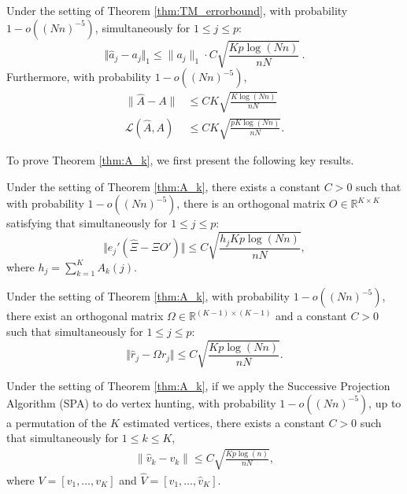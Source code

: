 \documentclass[preprint,11pt]{article}
\numberwithin{equation}{section}
\begin{document}
\begin{thm}[Estimation of $A$]\label{thm:A_k}
Under the setting of Theorem \ref{thm:TM_errorbound}, with probability $1- o((Nn)^{-5})$,  simultaneously for $1\leq j \leq p$:
\[
\Vert \hat a_j - a_j  \Vert_1 \leq \|a_j\|_1\cdot C \sqrt{\frac{Kp\log (Nn)}{nN}}\,. 
\]
Furthermore, with probability $1- o((Nn)^{-5})$,
\begin{align*}
\|\widehat{A}-A\|&\leq C  K\sqrt{\frac{K\log (Nn)}{nN}} \\
\mathcal L (\widehat A, A)  
&\leq C  K\sqrt{\frac{pK\log (Nn)}{nN}}.
\end{align*}
\end{thm}

To prove Theorem \ref{thm:A_k}, we first present the following key results. 
\begin{thm}\label{thm:row_eigenv}
Under the setting of Theorem \ref{thm:A_k}, there exists a constant $C>0$ such that with probability $1- o((Nn)^{-5})$, there is an orthogonal matrix $O\in \mathbb{R}^{K\times K}$ satisfying that simultaneously for $1\leq j \leq p$:
\[
\Vert e_j' (\hat \Xi- \Xi O')   \Vert \leq C \sqrt{\frac{h_j Kp\log (Nn)}{nN}}, 
\]
where $h_j = \sum_{k=1}^K A_k(j)$.
\end{thm}

\begin{thm}\label{thm:word_embeddings}
Under the setting of Theorem \ref{thm:A_k}, with probability $1-o((Nn)^{-5})$, 
there exist an orthogonal matrix $\Omega \in \mathbb{R}^{(K-1)\times (K-1)}$ and a constant $C>0$ such that simultaneously for $1\leq j \leq p$:
\[
\Vert \hat r_j - \Omega r_j   \Vert \leq C \sqrt{\frac{Kp\log(Nn)}{nN}}. 
\]
\end{thm}



\begin{thm}\label{thm:VH_error}
Under the setting of Theorem \ref{thm:A_k}, if we apply the Successive Projection Algorithm (SPA) to do vertex hunting, with probability $1-o((Nn)^{-5})$, up to a permutation of the $K$ estimated vertices, there exists a constant $C>0$ such that simultaneously for $1\le k\le K$,
\begin{align*}
    \|\hat{v}_k-v_k\|\le C \sqrt{\frac{Kp\log(n)}{nN}},
\end{align*}
where $V=[v_1,\ldots,v_K]$ and $\widehat{V}=[\hat{v}_1,\ldots,\hat{v}_K]$.
\end{thm}
\end{document}
